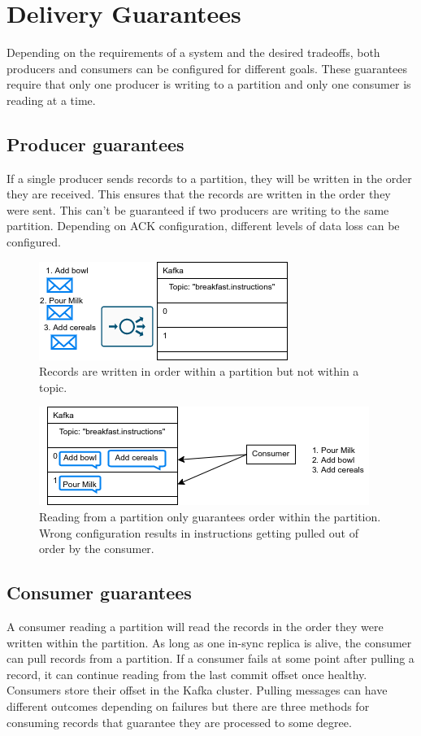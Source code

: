 \documentclass[11pt]{article}
\begin{document}
\section{Delivery Guarantees}
Depending on the requirements of a system and the desired tradeoffs, both producers and consumers can be configured for different goals. These guarantees require that only one producer is writing to a partition and only one consumer is reading at a time.

\subsection{Producer guarantees}

If a single producer sends records to a partition, they will be written in the order they are received. This ensures that the records are written in the order they were sent. This can't be guaranteed if two producers are writing to the same partition. Depending on ACK configuration, different levels of data loss can be configured.

\begin{figure}[htbp]
\centerline{\includegraphics[scale=0.8]{assets/write.png}}
\caption{Records are written in order within a partition but not within a topic.}
\label{fig}
\end{figure}

\begin{figure}[htbp]
\centerline{\includegraphics[scale=0.8]{assets/read.png}}
\caption{Reading from a partition only guarantees order within the partition. Wrong configuration results in instructions getting pulled out of order by the consumer.}
\label{fig}
\end{figure}

\subsection{Consumer guarantees}
A consumer reading a partition will read the records in the order they were written within the partition.
As long as one in-sync replica is alive, the consumer can pull records from a partition. If a consumer fails at some point after pulling a record, it can continue reading from the last commit offset once healthy. Consumers store their offset in the Kafka cluster.
\newline
\newline
Pulling messages can have different outcomes depending on failures but there are three methods for consuming records that guarantee they are processed to some degree.
\end{document}
